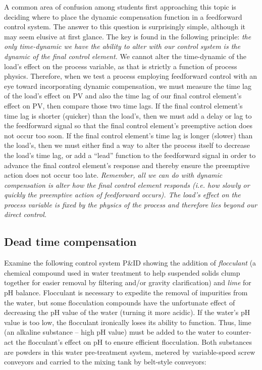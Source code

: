 A common area of confusion among students first approaching this topic is deciding where to place the dynamic compensation function in a feedforward control system.  The answer to this question is surprisingly simple, although it may seem elusive at first glance.  The key is found in the following principle: \textit{the only time-dynamic we have the ability to alter with our control system is the dynamic of the final control element.}  We cannot alter the time-dynamic of the load's effect on the process variable, as that is strictly a function of process physics.  Therefore, when we test a process employing feedforward control with an eye toward incorporating dynamic compensation, we must measure the time lag of the load's effect on PV and also the time lag of our final control element's effect on PV, then compare those two time lags.  If the final control element's time lag is shorter (quicker) than the load's, then we must add a delay or lag to the feedforward signal so that the final control element's preemptive action does not occur too soon.  If the final control element's time lag is longer (slower) than the load's, then we must either find a way to alter the process itself to decrease the load's time lag, or add a ``lead'' function to the feedforward signal in order to advance the final control element's response and thereby ensure the preemptive action does not occur too late.  \textit{Remember, all we can do with dynamic compensation is alter how the final control element responds (i.e. how slowly or quickly the preemptive action of feedforward occurs).  The load's effect on the process variable is fixed by the physics of the process and therefore lies beyond our direct control.}








\filbreak
\subsection{Dead time compensation}

Examine the following control system P\&ID showing the addition of \textit{flocculant} (a chemical compound used in water treatment to help suspended solids clump together for easier removal by filtering and/or gravity clarification) and \textit{lime} for pH balance.  Flocculant is necessary to expedite the removal of impurities from the water, but some flocculation compounds have the unfortunate effect of decreasing the pH value of the water (turning it more acidic).  If the water's pH value is too low, the flocculant ironically loses its ability to function.  Thus, lime (an alkaline substance -- high pH value) must be added to the water to counter-act the flocculant's effect on pH to ensure efficient flocculation.  Both substances are powders in this water pre-treatment system, metered by variable-speed screw conveyors and carried to the mixing tank by belt-style conveyors:

